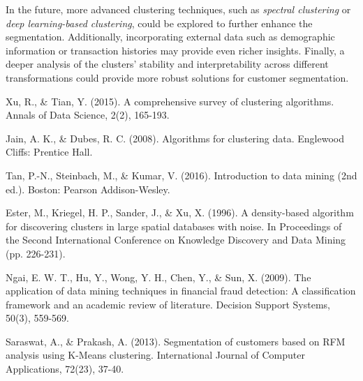 \documentclass[runningheads,a4paper]{llncs}
\begin{document}
In the future, more advanced clustering techniques, such as \textit{spectral clustering} or \textit{deep learning-based clustering}, could be explored to further enhance the segmentation. Additionally, incorporating external data such as demographic information or transaction histories may provide even richer insights. Finally, a deeper analysis of the clusters' stability and interpretability across different transformations could provide more robust solutions for customer segmentation.

\begin{thebibliography}{4}

 Xu, R., \& Tian, Y. (2015). A comprehensive survey of clustering algorithms. Annals of Data Science, 2(2), 165-193.

 Jain, A. K., \& Dubes, R. C. (2008). Algorithms for clustering data. Englewood Cliffs: Prentice Hall.

 Tan, P.-N., Steinbach, M., \& Kumar, V. (2016). Introduction to data mining (2nd ed.). Boston: Pearson Addison-Wesley.

 Ester, M., Kriegel, H. P., Sander, J., \& Xu, X. (1996). A density-based algorithm for discovering clusters in large spatial databases with noise. In Proceedings of the Second International Conference on Knowledge Discovery and Data Mining (pp. 226-231).

 Ngai, E. W. T., Hu, Y., Wong, Y. H., Chen, Y., \& Sun, X. (2009). The application of data mining techniques in financial fraud detection: A classification framework and an academic review of literature. Decision Support Systems, 50(3), 559-569.

 Saraswat, A., \& Prakash, A. (2013). Segmentation of customers based on RFM analysis using K-Means clustering. International Journal of Computer Applications, 72(23), 37-40. 

\end{thebibliography}
\end{document}
